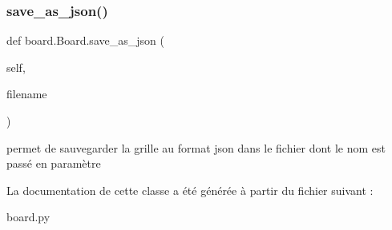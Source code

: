 \subsubsection{\texorpdfstring{save\+\_\+as\+\_\+json()}{save\_as\_json()}}
{\footnotesize\ttfamily def board.\+Board.\+save\+\_\+as\+\_\+json (\begin{DoxyParamCaption}\item[{}]{self,  }\item[{}]{filename }\end{DoxyParamCaption})}

\begin{DoxyVerb}permet de sauvegarder la grille au format json dans le fichier
dont le nom est passé en paramètre
\end{DoxyVerb}
 

La documentation de cette classe a été générée à partir du fichier suivant \+:\begin{DoxyCompactItemize}
\item 
board.\+py\end{DoxyCompactItemize}
